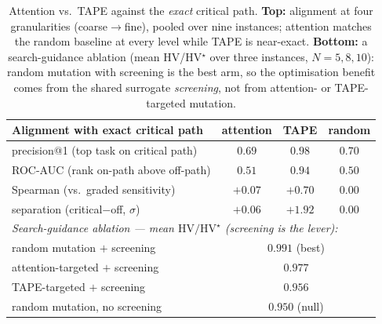 \documentclass[11pt]{article}
\begin{document}
\begin{table}[t]
\centering\small
\caption{Attention vs.\ TAPE against the \emph{exact} critical path. \textbf{Top:} alignment
at four granularities (coarse$\to$fine), pooled over nine instances; attention matches the
random baseline at every level while TAPE is near-exact. \textbf{Bottom:} a search-guidance
ablation (mean HV/HV$^\star$ over three instances, $N{=}5,8,10$): random mutation with
screening is the best arm, so the optimisation benefit comes from the shared surrogate
\emph{screening}, not from attention- or TAPE-targeted mutation.}
\label{tab:ladder}
\setlength{\tabcolsep}{6pt}
\begin{tabular}{lccc}
\toprule
Alignment with exact critical path & attention & TAPE & random \\
\midrule
precision@1 (top task on critical path) & $0.69$ & $\mathbf{0.98}$ & $0.70$ \\
ROC-AUC (rank on-path above off-path)   & $0.51$ & $\mathbf{0.94}$ & $0.50$ \\
Spearman (vs.\ graded sensitivity)      & $+0.07$ & $\mathbf{+0.70}$ & $0.00$ \\
separation (critical$-$off, $\sigma$)   & $+0.06$ & $\mathbf{+1.92}$ & $0.00$ \\
\midrule
\multicolumn{4}{l}{\emph{Search-guidance ablation --- mean $\mathrm{HV}/\mathrm{HV}^\star$ (screening is the lever):}}\\
random mutation $+$ screening      & \multicolumn{3}{c}{$\mathbf{0.991}$ \;\;(best)} \\
attention-targeted $+$ screening   & \multicolumn{3}{c}{$0.977$} \\
TAPE-targeted $+$ screening        & \multicolumn{3}{c}{$0.956$} \\
random mutation, no screening & \multicolumn{3}{c}{$0.950$ \;\;(null)} \\
\bottomrule
\end{tabular}
\end{table}
\end{document}
